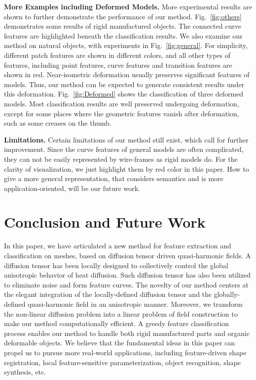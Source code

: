 \documentclass[10pt,journal,cspaper,compsoc]{IEEEtran}
\begin{document}
\textbf{More Examples including Deformed Models.}
More experimental results are shown to further demonstrate the
performance of our method. Fig.~\ref{fig:others} demonstrates some
results of rigid manufactured objects. The connected curve features
are highlighted beneath the classification results. We also examine
our method on natural objects, with experiments in
Fig.~\ref{fig:general}. For simplicity, different patch features are
shown in different colors, and all other types of features, including
point features, curve features and transition features are shown in
red. Near-isometric deformation usually preserves significant features
of models.  Thus, our method can be expected to generate consistent
results under this deformation.  Fig.~\ref{fig:Deformed} shows the
classification of three deformed models.  Most classification results
are well preserved undergoing deformation, except for some places
where the geometric features vanish after deformation, such as some
creases on the thumb.

\textbf{Limitations.}
Certain limitations of our method still exist, which call for further
improvement. Since the curve features of general models are often
complicated, they can not be easily represented by wire-frames as
rigid models do. For the clarity of visualization, we just highlight
them by red color in this paper. How to give a more general
representation, that considers semantics and is more
application-oriented, will be our future work.

\section{Conclusion and Future Work}
\label{sec:CFW}

In this paper, we have articulated a new method for feature extraction
and classification on meshes, based on diffusion tensor driven
quasi-harmonic fields. A diffusion tensor has been locally designed to
collectively control the global anisotropic behavior of heat
diffusion. Such diffusion tensor has also been utilized to eliminate
noise and form feature curves.  The novelty of our method centers at
the elegant integration of the locally-defined diffusion tensor and
the globally-defined quasi-harmonic field in an anisotropic
manner. Moreover, we transform the non-linear diffusion problem into a
linear problem of field construction to make our method
computationally efficient.  A greedy feature classification process
enables our method to handle both rigid manufactured parts and organic
deformable objects. We believe that the fundamental ideas in this
paper can propel us to pursue more real-world applications, including
feature-driven shape registration, local feature-sensitive
parameterization, object recognition, shape synthesis, etc.
\end{document}
